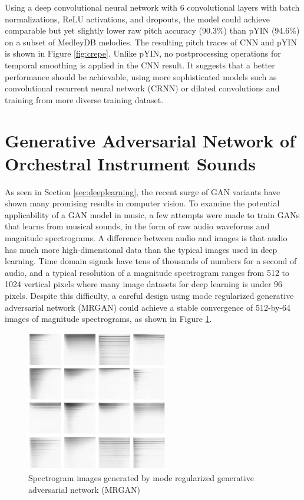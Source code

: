 Using a deep convolutional neural network with 6 convolutional layers with batch normalizations, ReLU activations, and dropouts, the model could achieve comparable but yet slightly lower raw pitch accuracy (90.3\%) than pYIN (94.6\%) on a subset of MedleyDB \cite{bittner2014medleydb} melodies.
The resulting pitch traces of CNN and pYIN is shown in Figure \ref{fig:crepe}.
Unlike pYIN, no postprocessing operations for temporal smoothing is applied in the CNN result.
It suggests that a better performance should be achievable, using more sophisticated models such as convolutional recurrent neural network (CRNN) or dilated convolutions and training from more diverse training dataset.


\section{Generative Adversarial Network of Orchestral Instrument Sounds}

As seen in Section \ref{sec:deeplearning}, the recent surge of GAN variants have shown many promising results in computer vision.
To examine the potential applicability of a GAN model in music, a few attempts were made to train GANs that learns from musical sounds, in the form of raw audio waveforms and magnitude spectrograms.
A difference between audio and images is that audio has much more high-dimensional data than the typical images used in deep learning.
Time domain signals have tens of thousands of numbers for a second of audio, and a typical resolution of a magnitude spectrogram ranges from 512 to 1024 vertical pixels where many image datasets for deep learning is under 96 pixels.
Despite this difficulty, a careful design using mode regularized generative adversarial network (MRGAN) \cite{che2016mrgan} could achieve a stable convergence of 512-by-64 images of magnitude spectrograms, as shown in Figure \ref{fig:gan}.

\begin{figure}
	\centering
	\includegraphics[width=0.55\textwidth]{gan.jpg}
	\caption{Spectrogram images generated by mode regularized generative adversarial network (MRGAN) %
	}\label{fig:gan}
\end{figure}

